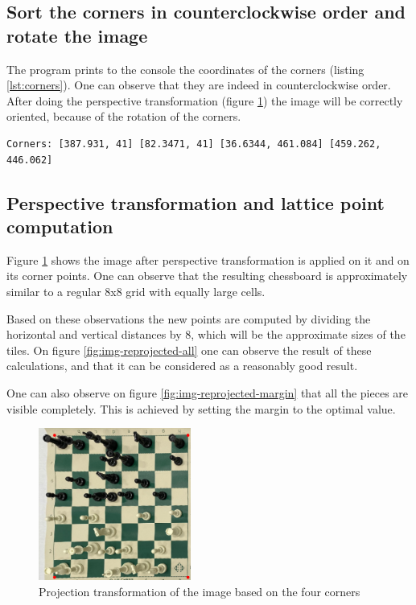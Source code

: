 \documentclass[conference]{IEEEtran}
\begin{document}
\subsection{Sort the corners in counterclockwise order and rotate the image}

The program prints to the console the coordinates of the corners (listing \ref{lst:corners}). One can observe that they are indeed in counterclockwise order. After doing the perspective transformation (figure \ref{fig:img-reprojected}) the image will be correctly oriented, because of the rotation of the corners.

\begin{lstlisting}[label={lst:corners},caption={Corner coordinates of the chessboard}]
Corners: [387.931, 41] [82.3471, 41] [36.6344, 461.084] [459.262, 446.062]
\end{lstlisting}


\subsection{Perspective transformation and lattice point computation}

Figure \ref{fig:img-reprojected} shows the image after perspective transformation is applied on it and on its corner points. One can observe that the resulting chessboard is approximately similar to a regular 8x8 grid with equally large cells.

Based on these observations the new points are computed by dividing the horizontal and vertical distances by 8, which will be the approximate sizes of the tiles. On figure \ref{fig:img-reprojected-all} one can observe the result of these calculations, and that it can be considered as a reasonably good result.

One can also observe on figure \ref{fig:img-reprojected-margin} that all the pieces are visible completely. This is achieved by setting the margin to the optimal value.

\begin{figure}[bt] 
    \centering
    \includegraphics[width=5cm]{Figures/Reprojected image with four corners.png}
    \caption{Projection transformation of the image based on the four corners}
    \label{fig:img-reprojected}
\end{figure}
\end{document}
